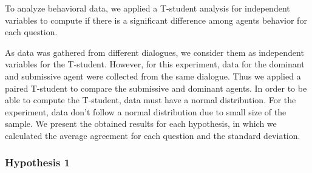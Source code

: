 \documentclass{llncs}
\begin{document}
\par To analyze behavioral data, we applied a T-student analysis for independent variables to compute if there is a significant difference among agents behavior for each question.  

\par As data was gathered from different dialogues, we consider them as independent variables for the T-student. However, for this experiment, data for the dominant and submissive agent were collected from the same dialogue. Thus we applied a paired T-student to compare the submissive and dominant agents.
In order to be able to compute the T-student, data must have a normal distribution. For the experiment, data don't follow a normal distribution due to small size of the sample.
We present the obtained results for each hypothesis, in which we calculated the average agreement for each question and the standard deviation.

\subsubsection{Hypothesis 1 }



\end{document}
